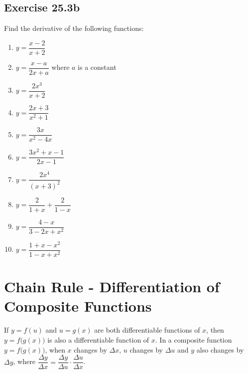 \documentclass[12pt]{report}
\begin{document}
\subsection*{Exercise 25.3b}
\noindent Find the derivative of the following functions:
\setlength{\columnseprule}{1pt}
\setlength{\columnsep}{24pt}
\begin{multicols}{2}
  \begin{enumerate}
    \item $y={\dfrac{x-2}{x+2}}$
    \item $y={\dfrac{x-a}{2x+a}}$ where $a$ is a constant
    \item $y={\dfrac{2x^{3}}{x+2}}$
    \item $y={\dfrac{2x+3}{x^{2}+1}}$
    \item $y={\dfrac{3x}{x^{2}-4x}}$
    \item $y={\dfrac{3x^{2}+x-1}{2x-1}}$
    \item $y={\dfrac{2x^{4}}{\left(x+3\right)^{2}}}$
    \item $y={\dfrac{2}{1+x}}+{\dfrac{2}{1-x}}$
    \item $y={\dfrac{4-x}{3-2x+x^{2}}}$
    \item $y={\dfrac{1+x-x^{2}}{1-x+x^{2}}}$
  \end{enumerate}
\end{multicols}

\section{Chain Rule - Differentiation of Composite Functions}

If $y = f(u)$ and $u = g(x)$ are both differentiable functions of $x$, then $y
  = f\bigl(g(x)\bigr)$ is also a differentiable function of $x$. In a composite
function $y = f\bigl(g(x)\bigr)$, when $x$ changes by $\Delta x$, $u$ changes
by $\Delta u$ and $y$ also changes by $\Delta y$, where $\dfrac{\Delta
    y}{\Delta x} = \dfrac{\Delta y}{\Delta u} \cdot \dfrac{\Delta u}{\Delta x}$.
\end{document}
